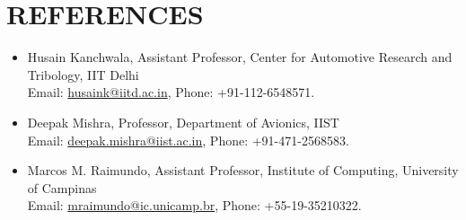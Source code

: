 \documentclass[11pt]{article}
\begin{document}
	\section*{\bf REFERENCES}
\begin{itemize}
	\item Husain Kanchwala, Assistant Professor, Center for Automotive Research and Tribology, IIT Delhi \\
	Email: \href{mailto:husaink@iitd.ac.in}{husaink@iitd.ac.in}, Phone: +91-112-6548571.
	\item Deepak Mishra, Professor, Department of Avionics, IIST \\
	Email: \href{mailto:deepak.mishra@iist.ac.in}{deepak.mishra@iist.ac.in}, Phone: +91-471-2568583.
	\item Marcos M. Raimundo, Assistant Professor, Institute of Computing, University of Campinas \\
	Email: \href{mailto:mraimundo@ic.unicamp.br}{mraimundo@ic.unicamp.br}, Phone: +55-19-35210322.
\end{itemize}
	
\end{document}

